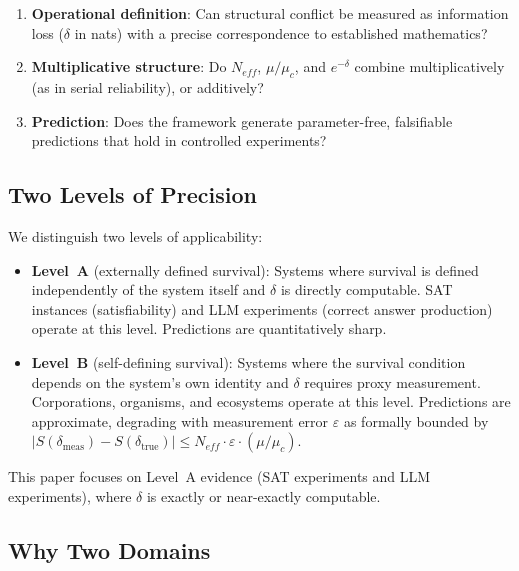 \documentclass[11pt,a4paper]{article}
\begin{document}
\begin{enumerate}
    \item \textbf{Operational definition}: Can structural conflict be measured as information loss ($\delta$ in nats) with a precise correspondence to established mathematics?
    \item \textbf{Multiplicative structure}: Do $N_{eff}$, $\mu/\mu_c$, and $e^{-\delta}$ combine multiplicatively (as in serial reliability), or additively?
    \item \textbf{Prediction}: Does the framework generate parameter-free, falsifiable predictions that hold in controlled experiments?
\end{enumerate}

\subsection{Two Levels of Precision}

We distinguish two levels of applicability:

\begin{itemize}
    \item \textbf{Level~A} (externally defined survival): Systems where survival is defined independently of the system itself and $\delta$ is directly computable. SAT instances (satisfiability) and LLM experiments (correct answer production) operate at this level. Predictions are quantitatively sharp.

    \item \textbf{Level~B} (self-defining survival): Systems where the survival condition depends on the system's own identity and $\delta$ requires proxy measurement. Corporations, organisms, and ecosystems operate at this level. Predictions are approximate, degrading with measurement error $\varepsilon$ as formally bounded by $|S(\delta_{\text{meas}}) - S(\delta_{\text{true}})| \leq N_{eff} \cdot \varepsilon \cdot (\mu/\mu_c)$.
\end{itemize}

This paper focuses on Level~A evidence (SAT experiments and LLM experiments), where $\delta$ is exactly or near-exactly computable.

\subsection{Why Two Domains}
\end{document}
